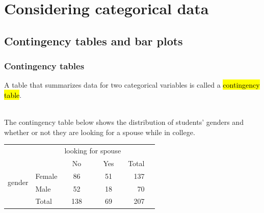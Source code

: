 
\section{Considering categorical data}


\subsection{Contingency tables and bar plots}


\begin{frame}
\frametitle{Contingency tables}

A table that summarizes data for two categorical variables is called a \hl{contingency table}.

$\:$ \\
\pause
The contingency table below shows the distribution of students' genders and whether or not they are looking for a spouse while in college.

\begin{center}
\begin{tabular}{l l cc rr}
					& 			& \multicolumn{2}{c}{{looking for spouse}} \\
  \cline{3-4}
					&			& No	& Yes	& Total & \hspace{3mm}  \\ 
  \cline{2-5}
\multirow{2}{*}{{gender}}& Female 		& 86 	& 51 		& 137 \\ 
  					& Male 		& 52 	& 18	 	& 70\\ 
  \cline{2-5}
  					& Total		& 138& 69	&  207 \\
  \cline{2-5}
\end{tabular}
\end{center}

\end{frame}



